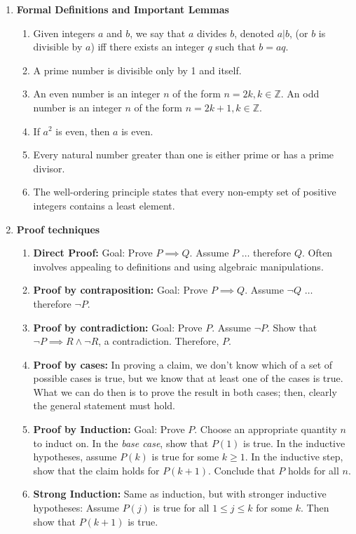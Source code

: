 \documentclass[10pt]{article}
\begin{document}
\begin{multicols}{2}
\begin{enumerate}
    \item \textbf{Formal Definitions and Important Lemmas}
    \begin{enumerate}
        \item Given integers $a$ and $b$, we say that $a$ divides $b$, denoted $a|b$, (or $b$ is divisible by $a$) iff there exists an integer $q$ such that $b = aq$.
        \item A prime number is divisible only by 1 and itself.
        \item An even number is an integer $n$ of the form $n=2k, k \in \mathbb{Z}$. An odd number is an integer $n$ of the form $n=2k+1, k \in \mathbb{Z}$.
        \item If $a^2$ is even, then $a$ is even.
        \item Every natural number greater than one is either prime or has a prime divisor.
        \item The well-ordering principle states that every non-empty set of positive integers contains a least element. 
    \end{enumerate}
    
    \item \textbf{Proof techniques}
    \begin{enumerate}
        \item \textbf{Direct Proof:} Goal: Prove $P \implies Q$. Assume $P$ $\hdots$ therefore $Q$. Often involves appealing to definitions and using algebraic manipulations.
        \item \textbf{Proof by contraposition:} Goal: Prove $P \implies Q$. Assume $\neg Q$ $\hdots$ therefore $\neg P$.
        \item \textbf{Proof by contradiction:} Goal: Prove $P$. Assume $\neg P$. Show that $\neg P \implies R \land \neg R$, a contradiction. Therefore, $P$.
        \item \textbf{Proof by cases:} In proving a claim, we don’t know which of a set of possible cases is true, but we know that at least one of the cases is true. What we can do then is to prove the result in both cases; then, clearly the general statement must hold.
        \item \textbf{Proof by Induction:} Goal: Prove $P$. Choose an appropriate quantity $n$ to induct on. In the \textit{base case}, show that $P(1)$ is true. In the inductive hypotheses, assume $P(k)$ is true for some $k \geq 1$. In the inductive step, show that the claim holds for $P(k+1)$. Conclude that $P$ holds for all $n$.
        \item \textbf{Strong Induction:} Same as induction, but with stronger inductive hypotheses: Assume $P(j)$ is true for all $1 \leq j \leq k$ for some $k$. Then show that $P(k+1)$ is true.
    \end{enumerate}
    

\end{enumerate}
\end{multicols}
\end{document}
